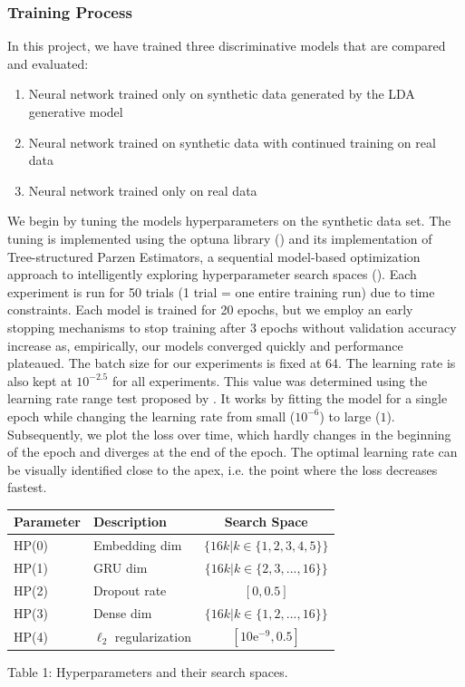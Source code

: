 \documentclass[11pt]{article}
\begin{document}
\subsubsection{Training Process}
In this project, we have trained three discriminative models that are compared and evaluated:
\begin{enumerate}
\itemsep0pt
  \item Neural network trained only on synthetic data generated by the LDA generative model
  \item Neural network trained on synthetic data with continued training on real data
  \item Neural network trained only on real data
\end{enumerate}


\noindent We begin by tuning the models hyperparameters on the synthetic data set. The tuning is implemented using the optuna library (\cite{optunapaper}) and its implementation of Tree-structured Parzen Estimators, a sequential model-based optimization approach to intelligently exploring hyperparameter search spaces (\cite{bergstraTPE}). Each experiment is run for 50 trials (1 trial = one entire training run) due to time constraints. Each model is trained for 20 epochs, but we employ an early stopping mechanisms to stop training after 3 epochs without validation accuracy increase as, empirically, our models converged quickly and performance plateaued. The batch size for our experiments is fixed at 64. The learning rate is also kept at $10^{-2.5}$ for all experiments. This value was determined using the learning rate range test proposed by \cite{smith2018disciplined}. It works by fitting the model for a single epoch while changing the learning rate from small ($10^{-6}$) to large ($1$). Subsequently, we plot the loss over time, which hardly changes in the beginning of the epoch and diverges at the end of the epoch. The optimal learning rate can be visually identified close to the apex, i.e. the point where the loss decreases fastest.

\begin{center}
\begin{tabular}{llc}
\toprule
    Parameter & Description & Search Space \\
\midrule
    HP(0) & Embedding dim & $\{16k \vert k\in \{1, 2, 3, 4, 5\}\}$\\
    HP(1) & GRU dim & $\{16k \vert k \in \{2, 3, ..., 16\}\}$\\
    HP(2) & Dropout rate & $[0, 0.5]$\\
    HP(3) & Dense dim &  $\{16k \vert k \in \{1, 2, ..., 16\}\}$\\
    HP(4) & $\ell_2$ regularization & $[10\mathrm{e}^{-9}, 0.5]$ \\
\bottomrule
\end{tabular}
\end{center}
\begin{center}
	Table 1: Hyperparameters and their search spaces.
\end{center}
\end{document}
